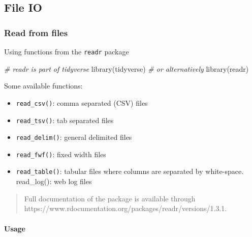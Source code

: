 \documentclass[
]{article}
\newenvironment{Shaded}{}{}
\newcommand{\CommentTok}[1]{\textcolor[rgb]{0.38,0.63,0.69}{\textit{#1}}}
\newcommand{\FunctionTok}[1]{\textcolor[rgb]{0.02,0.16,0.49}{#1}}
\newcommand{\NormalTok}[1]{#1}
\begin{document}
\hypertarget{file-io}{%
\subsection{File IO}\label{file-io}}

\hypertarget{read-from-files}{%
\subsubsection{Read from files}\label{read-from-files}}

Using functions from the \texttt{readr} package

\begin{Shaded}
\begin{Highlighting}[]
\CommentTok{\# readr is part of tidyverse }
\FunctionTok{library}\NormalTok{(tidyverse) }\CommentTok{\# or alternatively }
\FunctionTok{library}\NormalTok{(readr)}
\end{Highlighting}
\end{Shaded}

Some available functions:

\begin{itemize}
\item
  \texttt{read\_csv()}: comma separated (CSV) files
\item
  \texttt{read\_tsv()}: tab separated files
\item
  \texttt{read\_delim()}: general delimited files
\item
  \texttt{read\_fwf()}: fixed width files
\item
  \texttt{read\_table()}: tabular files where columns are separated by
  white-space. read\_log(): web log files
\end{itemize}

\begin{quote}
Full documentation of the package is available through 
https://www.rdocumentation.org/packages/readr/versions/1.3.1.
\end{quote}

\hypertarget{usage}{%
\paragraph{Usage}\label{usage}}
\end{document}
